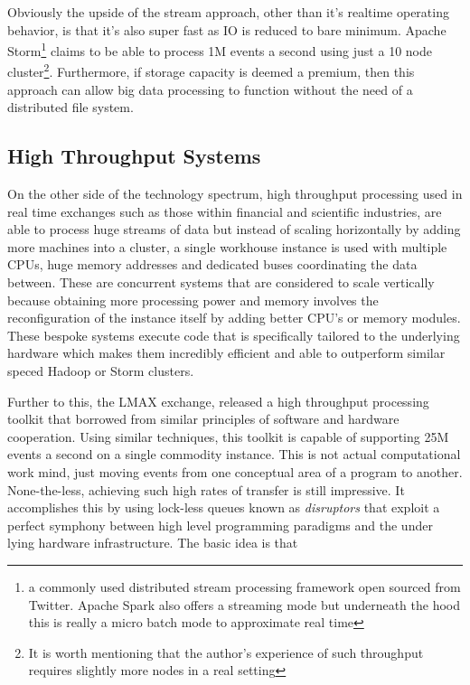 \documentclass[a4paper,11pt]{scrreprt}
\begin{document}
Obviously the upside of the stream approach, other than it's realtime operating behavior, is that it's also super fast as IO is reduced to bare minimum. Apache Storm\cite{storm-site}\footnote{a commonly used distributed stream processing framework open sourced from Twitter\cite{storm-twitter}. Apache Spark also offers a streaming mode but underneath the hood this is really a micro batch mode to approximate real time\cite{spark-streaming-paper}} claims to be able to process 1M events a second using just a 10 node cluster\footnote{It is worth mentioning that the author's experience of such throughput requires slightly more nodes in a real setting}. Furthermore, if storage capacity is deemed a premium, then this approach can allow big data processing to function without the need of a distributed file system. 

\subsection{High Throughput Systems}
On the other side of the technology spectrum, high throughput processing used in real time exchanges such as those within financial and scientific industries, are able to process huge streams of data but instead of scaling horizontally by adding more machines into a cluster, a single workhouse instance is used with multiple CPUs, huge memory addresses and dedicated buses coordinating the data between. These are concurrent systems that are considered to scale vertically because obtaining more processing power and memory involves the reconfiguration of the instance itself by adding better CPU's or memory modules. These bespoke systems execute code that is specifically tailored to the underlying hardware which makes them incredibly efficient and able to outperform similar speced Hadoop or Storm clusters. 

Further to this, the LMAX exchange, released a high throughput processing toolkit that borrowed from similar principles of software and hardware cooperation. Using similar techniques, this toolkit is capable of supporting 25M events a second on a single commodity instance\cite{disruptor-paper}. This is not actual computational work mind, just moving events from one conceptual area of a program to another. None-the-less, achieving such high rates of transfer is still impressive. It accomplishes this by using lock-less queues known as \textit{disruptors} that exploit a perfect symphony between high level programming paradigms and the under lying hardware infrastructure. The basic idea is that 
\end{document}
